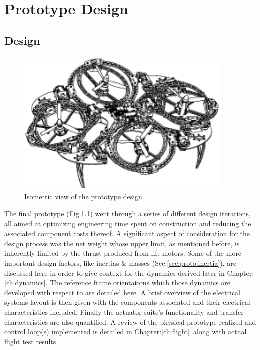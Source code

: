 \chapter{Prototype Design}
\label{ch:proto}
\section{Design}
\label{sec:proto.design}
\begin{figure}[htbp]
\centering
\includegraphics[width=0.93\textwidth]{figs/iso-design}
\caption{Isometric view of the prototype design}
\label{fig:iso-design}
\end{figure}
The final prototype (Fig:\ref{fig:iso-design}) went through a series of different design iterations, all aimed at optimizing engineering time spent on construction and reducing the associated component costs thereof. A significant aspect of consideration for the design process was the net weight whose upper limit, as mentioned before, is inherently limited by the thrust produced from lift motors. Some of the more important design factors, like inertias \& masses (Sec:\ref{sec:proto.inertia}), are discussed here in order to give context for the dynamics derived later in Chapter:\ref{ch:dynamics}. The reference frame orientations which those dynamics are developed with respect to are detailed here. A brief overview of the electrical systems layout is then given with the components associated and their electrical characteristics included. Finally the actuator suite's functionality and transfer characteristics are also quantified. A review of the physical prototype realized and control loop(s) implemented is detailed in Chapter:\ref{ch:flight}~along with actual flight test results.
